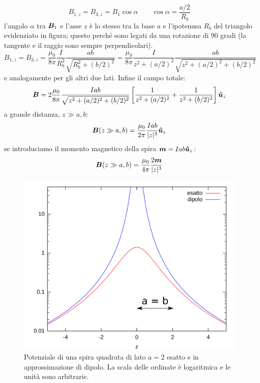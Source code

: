 \begin{Es}
  \[
    B_{1,z} = B_{3,z} = B_1\cos\alpha\qquad\cos\alpha = \frac{a/2}{R_b}
  \]
  l'angolo $\alpha$ tra $\boldsymbol{B}_1$ e l'asse $z$ è lo stesso tra la base $a$ e l'ipotenusa $R_b$ del triangolo evidenziato in figura; questo perché sono legati da una rotazione di 90 gradi (la tangente e il raggio sono sempre perpendicolari).
  \[
    B_{1,z} = B_{3,z} = \frac{\mu_0}{8\pi}\frac{I}{R_b^2}\frac{ab}{\sqrt{R_b^2+(b/2)^2}} = \frac{\mu_0}{8\pi}\frac{I}{z^2+(a/2)^2}\frac{ab}{\sqrt{z^2+(a/2)^2+(b/2)^2}}
  \]
  e analogamente per gli altri due lati. Infine il campo totale:
  \[
    \boldsymbol{B} = 2\frac{\mu_0}{8\pi}\frac{Iab}{\sqrt{z^2+(a/2)^2+(b/2)^2}}\left[\frac{1}{z^2+(a/2)^2}+\frac{1}{z^2+(b/2)^2}\right]\boldsymbol{\hat {u}}_z
  \]
  a grande distanza, $z\gg a,b$:
  \[
    \boldsymbol{B} (z\gg a,b) = \frac{\mu_0}{2\pi}\frac{Iab}{|z|^3}\boldsymbol{\hat {u}}_z
  \]
  se introduciamo il momento magnetico della spira $\boldsymbol{m}=Iab\boldsymbol{\hat {u}}_z$:
  \[
    \boldsymbol{B} (z\gg a,b) = \frac{\mu_0}{4\pi}\frac{2\boldsymbol{m}}{|z|^3}
  \]
  \begin{figure}[htbp]
    \centering
    \includegraphics[scale=0.5]{immagini/fisica2/potenziale_spira_rettangolare}
    \caption{Potenziale di una spira quadrata di lato $a=2$ esatto e in approssimazione di dipolo. La scala delle ordinate è logaritmica e le unità sono arbitrarie.}
  \end{figure}
\end{Es}

